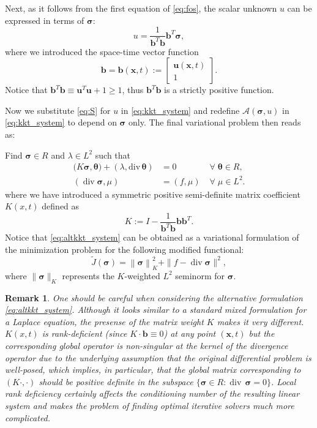 \documentclass[a4paper,12pt]{amsart}
\numberwithin{equation}{section}
\newtheorem{remark}{Remark}[section]
\renewcommand{\div}{\operatorname{div}}
\def\bu{{\mathbf u}}
\def\bb{{\mathbf b}}
\newcommand{\A}{{\mathcal A}}
\def\XVec#1{{\mathbf #1}}
\def\Xx{\XVec{x}}
\def\btheta{{\boldsymbol \theta}}
\def\bsigma{{\boldsymbol \sigma}}
\begin{document}
Next, as it follows from the first equation of \eqref{eq:fos},  the scalar unknown $u$ can be expressed in terms of $\bsigma$:
\begin{equation}
u = \frac1{\bb^T \bb }\bb^T \bsigma,
\label{eq:S}
\end{equation}
where we introduced the space-time vector function
\[
\bb = \bb(\Xx,t) := \begin{bmatrix} \bu(\Xx,t) \\ 1 \end{bmatrix}.
\]
Notice that $\bb^T\bb \equiv \bu^T\bu+1 \ge 1$, thus $\bb^T\bb$ is a strictly positive function.

Now we substitute \eqref{eq:S} for $u$ in \eqref{eq:kkt_system} and redefine $\A(\bsigma,u)$ in \eqref{eq:kkt_system} to depend on $\bsigma$ only. The final variational problem then reads as:

Find $\bsigma \in R$ and $\lambda \in L^2$ such that 
\begin{equation}
\begin{array}{lll}
\big( K \bsigma, \btheta \big) + (\lambda, \mathrm{div}\,  \btheta) & = 0  & \;\forall\; \btheta \in R,     \\
( \div  \bsigma,\mu )  &= (f, \mu) &  \;\forall\;  \mu\in L^2.
\end{array}
\label{eq:altkkt_system}
\end{equation}
where we have introduced a symmetric positive semi-definite matrix coefficient $K(x,t)$ defined as 
\begin{equation}
K :=  I - \frac{1}{\bb^T\bb} \bb \bb^T.
\end{equation}
Notice that \eqref{eq:altkkt_system} can be obtained as a variational formulation of the minimization problem for the following modified functional:
$$
\tilde{J}(\bsigma) = \left\| \bsigma \right\|_K^2 + \| f- \div \bsigma \| ^2, \label{modfunctional}
$$
where $\|\bsigma\|_K$ represents the $K$-weighted $L^2$ seminorm for $\bsigma$. 

\begin{remark}
One should be careful when considering the alternative formulation \eqref{eq:altkkt_system}. Although it looks similar to a standard mixed formulation for a Laplace equation, the presense of the matrix weight $K$ makes it very different. $K(x,t)$ is rank-deficient (since $K \cdot \bb \equiv 0$) at any point $(\Xx,t)$ but the corresponding global operator is non-singular at the kernel of the divergence operator due to the underlying assumption that the original differential problem is well-posed, which implies, in particular, that the global matrix corresponding to $(K\cdot,\cdot)$ should  be positive definite in the subspace $\{\bsigma \in R : \div \, \bsigma = 0\}$. Local rank deficiency certainly affects the conditioning number of the resulting linear system and makes the problem of finding optimal iterative solvers much more complicated.
\end{remark}
\end{document}
